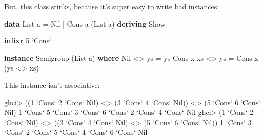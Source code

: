 \documentclass[]{article}
\newenvironment{Shaded}{}{}
\newcommand{\DataTypeTok}[1]{\textcolor[rgb]{0.56,0.13,0.00}{#1}}
\newcommand{\DecValTok}[1]{\textcolor[rgb]{0.25,0.63,0.44}{#1}}
\newcommand{\FunctionTok}[1]{\textcolor[rgb]{0.02,0.16,0.49}{#1}}
\newcommand{\KeywordTok}[1]{\textcolor[rgb]{0.00,0.44,0.13}{\textbf{#1}}}
\newcommand{\NormalTok}[1]{#1}
\newcommand{\OtherTok}[1]{\textcolor[rgb]{0.00,0.44,0.13}{#1}}
\begin{document}
But, this class stinks, because it's super easy to write bad instances:

\begin{Shaded}
\begin{Highlighting}[]
\KeywordTok{data} \DataTypeTok{List}\NormalTok{ a }\FunctionTok{=} \DataTypeTok{Nil} \FunctionTok{|} \DataTypeTok{Cons}\NormalTok{ a (}\DataTypeTok{List}\NormalTok{ a)}
    \KeywordTok{deriving} \DataTypeTok{Show}

\KeywordTok{infixr} \DecValTok{5} \OtherTok{`Cons`}

\KeywordTok{instance} \DataTypeTok{Semigroup}\NormalTok{ (}\DataTypeTok{List}\NormalTok{ a) }\KeywordTok{where}
    \DataTypeTok{Nil}       \FunctionTok{<>}\NormalTok{ ys }\FunctionTok{=}\NormalTok{ ys}
    \DataTypeTok{Cons}\NormalTok{ x xs }\FunctionTok{<>}\NormalTok{ ys }\FunctionTok{=} \DataTypeTok{Cons}\NormalTok{ x (ys }\FunctionTok{<>}\NormalTok{ xs)}
\end{Highlighting}
\end{Shaded}

This instance isn't associative:

\begin{Shaded}
\begin{Highlighting}[]
\NormalTok{ghci}\FunctionTok{>}\NormalTok{ ((}\DecValTok{1} \OtherTok{`Cons`} \DecValTok{2} \OtherTok{`Cons`} \DataTypeTok{Nil}\NormalTok{) }\FunctionTok{<>}\NormalTok{ (}\DecValTok{3} \OtherTok{`Cons`} \DecValTok{4} \OtherTok{`Cons`} \DataTypeTok{Nil}\NormalTok{)) }\FunctionTok{<>}\NormalTok{ (}\DecValTok{5} \OtherTok{`Cons`} \DecValTok{6} \OtherTok{`Cons`} \DataTypeTok{Nil}\NormalTok{)}
\DecValTok{1} \OtherTok{`Cons`} \DecValTok{5} \OtherTok{`Cons`} \DecValTok{3} \OtherTok{`Cons`} \DecValTok{6} \OtherTok{`Cons`} \DecValTok{2} \OtherTok{`Cons`} \DecValTok{4} \OtherTok{`Cons`} \DataTypeTok{Nil}
\NormalTok{ghci}\FunctionTok{>}\NormalTok{ (}\DecValTok{1} \OtherTok{`Cons`} \DecValTok{2} \OtherTok{`Cons`} \DataTypeTok{Nil}\NormalTok{) }\FunctionTok{<>}\NormalTok{ ((}\DecValTok{3} \OtherTok{`Cons`} \DecValTok{4} \OtherTok{`Cons`} \DataTypeTok{Nil}\NormalTok{) }\FunctionTok{<>}\NormalTok{ (}\DecValTok{5} \OtherTok{`Cons`} \DecValTok{6} \OtherTok{`Cons`} \DataTypeTok{Nil}\NormalTok{))}
\DecValTok{1} \OtherTok{`Cons`} \DecValTok{3} \OtherTok{`Cons`} \DecValTok{2} \OtherTok{`Cons`} \DecValTok{5} \OtherTok{`Cons`} \DecValTok{4} \OtherTok{`Cons`} \DecValTok{6} \OtherTok{`Cons`} \DataTypeTok{Nil}
\end{Highlighting}
\end{Shaded}
\end{document}
